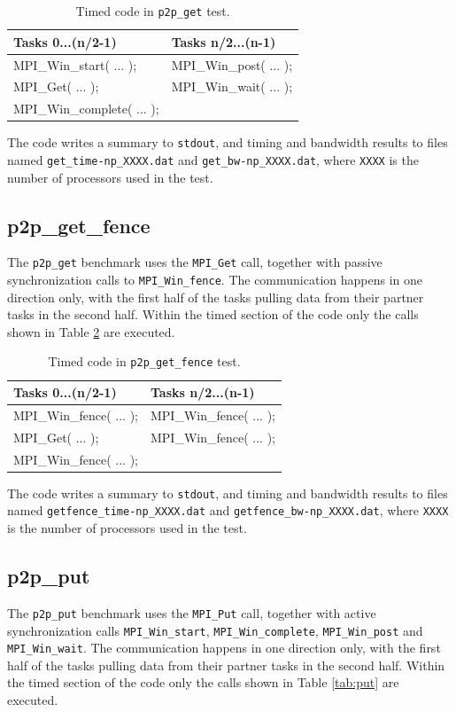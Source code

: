 \documentclass[10pt,a4paper]{report}
\begin{document}
\begin{table}[ht]
\centering
\caption{Timed code in \texttt{p2p\_get} test.}
\label{tab:get}
\begin{tabular}{|l|l|}
\hline
\bf{Tasks 0...(n/2-1)}	   & \bf{Tasks n/2...(n-1)}\\\hline
MPI\_Win\_start( ... );    & MPI\_Win\_post( ... );\\
MPI\_Get( ... );           & MPI\_Win\_wait( ... );\\
MPI\_Win\_complete( ... ); & \\\hline
\end{tabular}
\end{table}

The code writes a summary to \verb+stdout+, and timing and bandwidth results to files named \verb+get_time-np_XXXX.dat+ and \verb+get_bw-np_XXXX.dat+, where \verb+XXXX+ is the number of processors used in the test.

\FloatBarrier
\subsection{p2p\_get\_fence}
The \verb+p2p_get+ benchmark uses the \verb+MPI_Get+ call, together with passive synchronization calls to \verb+MPI_Win_fence+. The communication happens in one direction only, with the first half of the tasks pulling data from their partner tasks in the second half. Within the timed section of the code only the calls shown in Table \ref{tab:get_fence} are executed.

\begin{table}[ht]
\centering
\caption{Timed code in \texttt{p2p\_get\_fence} test.}
\label{tab:get_fence}
\begin{tabular}{|l|l|}
\hline
\bf{Tasks 0...(n/2-1)}	   & \bf{Tasks n/2...(n-1)}\\\hline
MPI\_Win\_fence( ... );    & MPI\_Win\_fence( ... );\\
MPI\_Get( ... );           & MPI\_Win\_fence( ... );\\
MPI\_Win\_fence( ... ); & \\\hline
\end{tabular}
\end{table}

The code writes a summary to \verb+stdout+, and timing and bandwidth results to files named \verb+getfence_time-np_XXXX.dat+ and \verb+getfence_bw-np_XXXX.dat+, where \verb+XXXX+ is the number of processors used in the test.

\FloatBarrier
\subsection{p2p\_put}
The \verb+p2p_put+ benchmark uses the \verb+MPI_Put+ call, together with active synchronization calls \verb+MPI_Win_start+, \verb+MPI_Win_complete+, \verb+MPI_Win_post+ and \verb+MPI_Win_wait+. The communication happens in one direction only, with the first half of the tasks pulling data from their partner tasks in the second half. Within the timed section of the code only the calls shown in Table \ref{tab:put} are executed.
\end{document}
